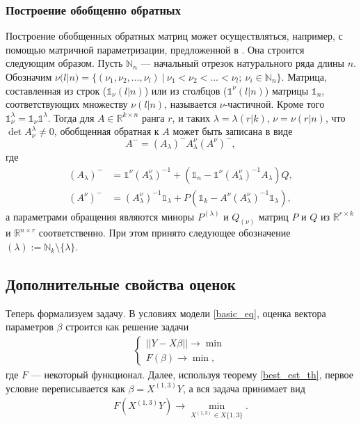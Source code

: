\documentclass{spisok-article}
\theoremstyle{definition}
\begin{document}
\subsubsection{Построение обобщенно обратных}
Построение обобщенных обратных матриц может осуществляться, например, с помощью матричной параметризации, предложенной в \cite{bart}. Она строится следующим образом. Пусть $\mathbb{N}_n$ --- начальный отрезок натурального ряда длины $n$. Обозначим $\nu(l|n) = \{(\nu_1, \nu_2, \dots, \nu_l)\ |\ \nu_1 < \nu_2 < \dots < \nu_l;\ \nu_i \in \mathbb{N}_n\}$. Матрица, составленная из строк ($\mathbb{1}_\nu(l|n)$) или из столбцов ($\mathbb{1}^\nu(l|n)$) матрицы $\mathbb{1}_n$, соответствующих множеству $\nu(l|n)$, называется $\nu$-частичной. Кроме того ${\mathbb{1}^\lambda_\nu}=\mathbb{1}_\nu\mathbb{1}^\lambda$. Тогда для $A \in \mathbb{R}^{k \times n}$ ранга $r$, и таких $\lambda = \lambda(r|k)$, $\nu = \nu(r|n)$, что $\det{A^\lambda_\nu} \neq 0$, обобщенная обратная к $A$ может быть записана в виде
\begin{equation*}
A^-=(A_\lambda)^-A^\nu_\lambda(A^\nu)^-,
\end{equation*}
где 
\begin{align*}
(A_\lambda)^- 	&= \mathbb{1}^\nu(A^\nu_\lambda)^{-1} + (\mathbb{1}_n - \mathbb{1}^\nu(A^\nu_\lambda)^{-1}A_\lambda)Q,\\
(A^\nu)^-		&=(A^\nu_\lambda)^{-1} \mathbb{1}_\lambda + P( \mathbb{1}_k - A^\nu(A^\nu_\lambda)^{-1}\mathbb{1}_\lambda), 
\end{align*}
а параметрами обращения являются миноры $P^{(\lambda)}$ и $Q_{(\nu)}$ матриц $P$ и $Q$ из $\mathbb{R}^{r \times k}$ и $\mathbb{R}^{n \times r}$ соответственно. При этом принято следующее обозначение $(\lambda) := \mathbb{N}_k \setminus \{\lambda\}$.

\subsection{Дополнительные свойства оценок}
Теперь формализуем задачу. В условиях модели \eqref{basic_eq}, оценка вектора параметров $\beta$ строится как решение задачи
\begin{align} \label{z_1}
\begin{cases}
||Y - X\beta|| \to \min\\
F(\beta) \to \min,
\end{cases} 
\end{align}
где $F$ --- некоторый функционал. Далее, используя теорему \ref{best_est_th}, первое условие переписывается как $\beta=X^{(1,3)}Y$, а вся задача принимает вид
\begin{align}
F(X^{(1,3)}Y) \to \min_{X^{(1,3)} \in X\{1,3\}}.  \tag{3.1}
\end{align}
\end{document}
